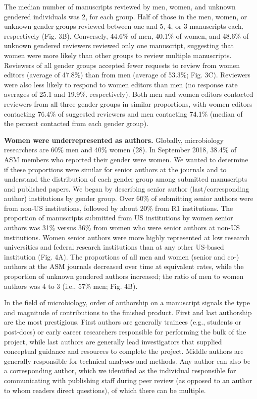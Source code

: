\documentclass[11pt,]{article}
\begin{document}
The median number of manuscripts reviewed by men, women, and unknown
gendered individuals was 2, for each group. Half of those in the men,
women, or unknown gender groups reviewed between one and 5, 4, or 3
manuscripts each, respectively (Fig. 3B). Conversely, 44.6\% of men,
40.1\% of women, and 48.6\% of unknown gendered reviewers reviewed only
one manuscript, suggesting that women were more likely than other groups
to review multiple manuscripts. Reviewers of all gender groups accepted
fewer requests to review from women editors (average of 47.8\%) than
from men (average of 53.3\%; Fig. 3C). Reviewers were also less likely
to respond to women editors than men (no response rate averages of 25.1
and 19.9\%, respectively). Both men and women editors contacted
reviewers from all three gender groups in similar proportions, with
women editors contacting 76.4\% of suggested reviewers and men
contacting 74.1\% (median of the percent contacted from each gender
group).

\textbf{Women were underrepresented as authors.} Globally, microbiology
researchers are 60\% men and 40\% women (28). In September 2018, 38.4\%
of ASM members who reported their gender were women. We wanted to
determine if these proportions were similar for senior authors at the
journals and to understand the distribution of each gender group among
submitted manuscripts and published papers. We began by describing
senior author (last/corresponding author) institutions by gender group.
Over 60\% of submitting senior authors were from non-US institutions,
followed by about 20\% from R1 institutions. The proportion of
manuscripts submitted from US institutions by women senior authors was
31\% versus 36\% from women who were senior authors at non-US
institutions. Women senior authors were more highly represented at low
research universities and federal research institutions than at any
other US-based institution (Fig. 4A). The proportions of all men and
women (senior and co-) authors at the ASM journals decreased over time
at equivalent rates, while the proportion of unknown gendered authors
increased; the ratio of men to women authors was 4 to 3 (i.e., 57\% men;
Fig. 4B).

In the field of microbiology, order of authorship on a manuscript
signals the type and magnitude of contributions to the finished product.
First and last authorship are the most prestigious. First authors are
generally trainees (e.g., students or post-docs) or early career
researchers responsible for performing the bulk of the project, while
last authors are generally lead investigators that supplied conceptual
guidance and resources to complete the project. Middle authors are
generally responsible for technical analyses and methods. Any author can
also be a corresponding author, which we identified as the individual
responsible for communicating with publishing staff during peer review
(as opposed to an author to whom readers direct questions), of which
there can be multiple.
\end{document}
